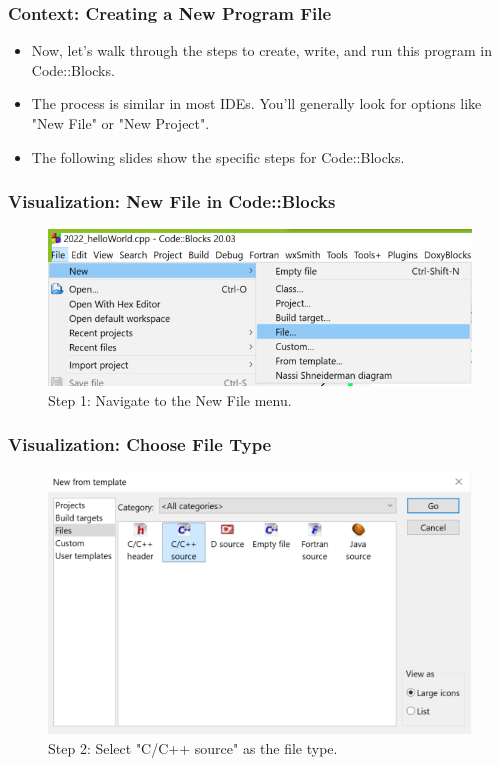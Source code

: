 \documentclass{beamer}
\begin{document}
\begin{frame}
\frametitle{Context: Creating a New Program File}
\begin{itemize}
\item Now, let's walk through the steps to create, write, and run this program in Code::Blocks.
\item The process is similar in most IDEs. You'll generally look for options like "New File" or "New Project".
\item The following slides show the specific steps for Code::Blocks.
\end{itemize}
\end{frame}

\begin{frame}
\frametitle{Visualization: New File in Code::Blocks}
\begin{figure}
\centering
\includegraphics[width=0.8\linewidth]{cs12-codeblocks-file-new-menu.png}
\caption{Step 1: Navigate to the New File menu.}
\end{figure}
\end{frame}

\begin{frame}
\frametitle{Visualization: Choose File Type}
\begin{figure}
\centering
\includegraphics[width=0.8\linewidth]{cs12-codeblocks-new-from-template.png}
\caption{Step 2: Select "C/C++ source" as the file type.}
\end{figure}
\end{frame}
\end{document}
